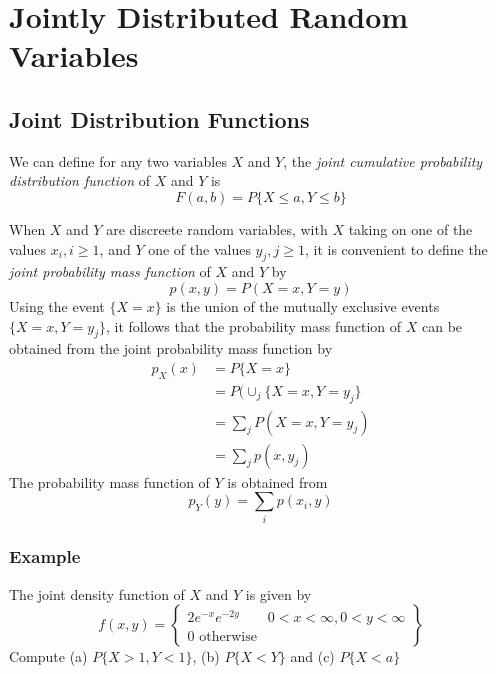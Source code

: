 \setcounter{chapter}{5}
\chapter{Jointly Distributed Random Variables}
\section{Joint Distribution Functions}
We can define for any two variables $X$ and $Y$, the \textit{joint cumulative probability distribution function} of $X$ and $Y$ is \[F(a,b) = P\{X\leq a, Y\leq b\}\]

When $X$ and $Y$ are discreete random variables, with $X$ taking on one of the values $x_i, i\geq 1$, and $Y$ one of the values $y_j, j\geq 1$, it is convenient to define the \textit{joint probability mass function} of $X$ and $Y$ by \[p(x,y) = P(X = x, Y = y)\]
Using the event $\{X = x\}$ is the union of the mutually exclusive events $\{X = x, Y= y_j\}$, it follows that the probability mass function of $X$ can be obtained from the joint probability mass function by 
\begin{equation*}
    \begin{split}
        p_X(x) &= P\{X = x\}\\
        &= P(\cup_j \{X = x, Y= y_j\}\\
        &= \sum_j P(X = x, Y = y_j)\\
        &= \sum_j p(x,y_j)
    \end{split}     
\end{equation*}
The probability mass function of $Y$ is obtained from \[p_Y(y) = \sum_i p(x_i, y)\]
\subsection*{Example}
The joint density function of $X$ and $Y$ is given by 
\begin{equation*}
    f(x,y) =
    \left\{
        \begin{array}{lr}
            2e^{-x}e^{-2y}\qquad 0 < x < \infty, 0 < y < \infty\\
            0 \text{ otherwise}
        \end{array}
    \right\}
\end{equation*}
Compute (a) $P\{X > 1 , Y < 1\}$, (b) $P\{X < Y\}$ and (c) $P\{X < a\}$
